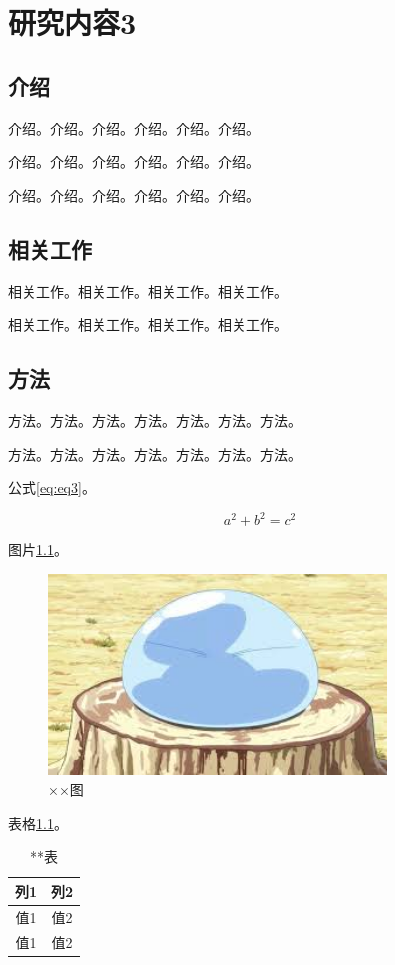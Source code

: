 \chapter{研究内容3}
    \thispagestyle{mainstyle} %
    \section{介绍}
    介绍。介绍。介绍。介绍。介绍。介绍。

    介绍。介绍。介绍。介绍。介绍。介绍。

    介绍。介绍。介绍。介绍。介绍。介绍。

    \section{相关工作}
    相关工作。相关工作。相关工作。相关工作。

    相关工作。相关工作。相关工作。相关工作。

    \section{方法}
    方法。方法。方法。方法。方法。方法。方法。

    方法。方法。方法。方法。方法。方法。方法。

    公式\ref{eq:eq3}。

    \begin{equation}
        a^2 + b^2 = c^2 \label{eq:eq3}
    \end{equation}

    图片\ref{fig:image3}。
    \begin{figure}
        \centering
        \includegraphics[width=0.8\textwidth]{images/image.jpeg}
        \caption{××图}
        \label{fig:image3}
    \end{figure}

    表格\ref{tab:table3}。
    \begin{table}
        \centering
        \caption{**表}
        \label{tab:table3}
        \begin{tabular}{c|c}
            \toprule[1.5bp]
            列1 & 列2 \\
            \midrule[0.75bp]
            值1 & 值2 \\
            值1 & 值2 \\
            \bottomrule[1.5bp]
        \end{tabular}
    \end{table}

